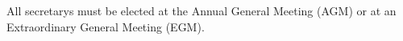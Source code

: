 \begin{clause}
  All secretarys must be elected at the Annual General Meeting (AGM) or at an Extraordinary General Meeting (EGM).
\end{clause}